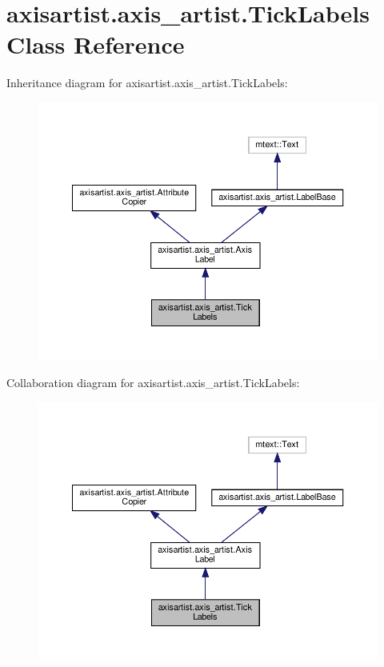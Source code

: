 \hypertarget{classaxisartist_1_1axis__artist_1_1TickLabels}{}\section{axisartist.\+axis\+\_\+artist.\+Tick\+Labels Class Reference}
\label{classaxisartist_1_1axis__artist_1_1TickLabels}


Inheritance diagram for axisartist.\+axis\+\_\+artist.\+Tick\+Labels\+:
\nopagebreak
\begin{figure}[H]
\begin{center}
\leavevmode
\includegraphics[width=350pt]{classaxisartist_1_1axis__artist_1_1TickLabels__inherit__graph}
\end{center}
\end{figure}


Collaboration diagram for axisartist.\+axis\+\_\+artist.\+Tick\+Labels\+:
\nopagebreak
\begin{figure}[H]
\begin{center}
\leavevmode
\includegraphics[width=350pt]{classaxisartist_1_1axis__artist_1_1TickLabels__coll__graph}
\end{center}
\end{figure}
